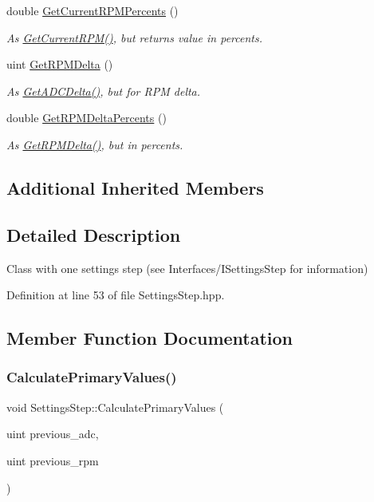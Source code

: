 \begin{DoxyCompactItemize}
double \hyperlink{class_settings_step_a35bea9115637a0c848e8f827f2353c11}{Get\+Current\+R\+P\+M\+Percents} ()
\begin{DoxyCompactList}\small\item\em As \hyperlink{class_settings_step_aaba560b593af9bc96eeed3db01a469f4}{Get\+Current\+R\+P\+M()}, but returns value in percents. \end{DoxyCompactList}\item 
uint \hyperlink{class_settings_step_a594ce71fb0626c79c3e4d4f988e484af}{Get\+R\+P\+M\+Delta} ()
\begin{DoxyCompactList}\small\item\em As \hyperlink{class_settings_step_aee30aaa97692d6b546e9dd002900f52e}{Get\+A\+D\+C\+Delta()}, but for R\+PM delta. \end{DoxyCompactList}\item 
double \hyperlink{class_settings_step_ada359fe4bfdaf271e621ec2943c0644c}{Get\+R\+P\+M\+Delta\+Percents} ()
\begin{DoxyCompactList}\small\item\em As \hyperlink{class_settings_step_a594ce71fb0626c79c3e4d4f988e484af}{Get\+R\+P\+M\+Delta()}, but in percents. \end{DoxyCompactList}\end{DoxyCompactItemize}
\subsection*{Additional Inherited Members}


\subsection{Detailed Description}
Class with one settings step (see Interfaces/\+I\+Settings\+Step for information) 

Definition at line 53 of file Settings\+Step.\+hpp.



\subsection{Member Function Documentation}
\mbox{\label{class_settings_step_ac6f79a139ab25cc50ed105f64fc9652f}} 
\subsubsection{\texorpdfstring{Calculate\+Primary\+Values()}{CalculatePrimaryValues()}}
{\footnotesize\ttfamily void Settings\+Step\+::\+Calculate\+Primary\+Values (\begin{DoxyParamCaption}\item[{uint}]{previous\+\_\+adc,  }\item[{uint}]{previous\+\_\+rpm }\end{DoxyParamCaption})\hspace{0.3cm}{\ttfamily [virtual]}}



